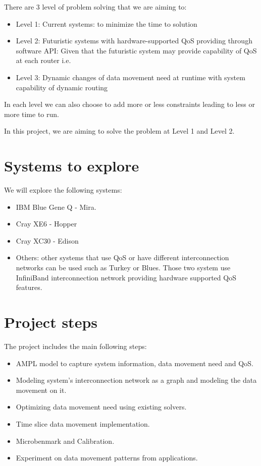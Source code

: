 \documentclass[letter]{article}
\begin{document}
There are 3 level of problem solving that we are aiming to:
\begin{itemize}
\item Level 1: Current systems: to minimize the time to solution
\item Level 2: Futuristic systems with hardware-supported QoS providing through software API: Given that the futuristic system may provide capability of QoS at each router i.e.
\item Level 3: Dynamic changes of data movement need at runtime with system capability of dynamic routing
\end{itemize}

In each level we can also choose to add more or less constraints leading to less or more time to run.

In this project, we are aiming to solve the problem at Level 1 and Level 2.

\section {Systems to explore}
We will explore the following systems: 
\begin{itemize}
\item IBM Blue Gene Q - Mira.
\item Cray XE6 - Hopper
\item Cray XC30 - Edison
\item Others: other systems that use QoS or have different interconnection networks can be used such as Turkey or Blues. Those two system use InfiniBand interconnection network providing hardware supported QoS features.
\end{itemize}

\section{Project steps}

The project includes the main following steps:
\begin{itemize}
\item AMPL model to capture system information, data movement need and QoS.
\item Modeling system's interconnection network as a graph and modeling the data movement on it.
\item Optimizing data movement need using existing solvers.
\item Time slice data movement implementation.
\item Microbenmark and Calibration.
\item Experiment on data movement patterns from applications.
\end{itemize}
\end{document}
